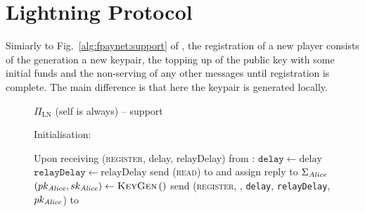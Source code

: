 \section{Lightning Protocol}
  \label{appendix:protocol}

  Simiarly to Fig.~\ref{alg:fpaynet:support} of \fpaynet, the registration of a
  new player consists of the generation a new keypair, the topping up of the
  public key with some initial funds and the non-serving of any other messages
  until registration is complete. The main difference is that here the keypair
  is generated locally.

  \begin{figure}[H]
    \begin{protocolbox}{$\Pi_{\mathrm{LN}}$ (self is \alice{} always) --
    support}
      \begin{algorithmic}[1]
        \State Initialisation:
        \Indent
        \EndIndent
        \Statex

        \State Upon receiving (\textsc{register}, delay, relayDelay) from
        \environment:
        \Indent
          \State $\mathtt{delay} \gets \mathrm{delay}$ 
          \label{alg:protocol:support:delay}
          \State $\mathtt{relayDelay} \gets \mathrm{relayDelay}$
          \State send (\textsc{read}) to \ledger{} and assign reply to
          $\Sigma_{\mathit{Alice}}$
          \label{alg:protocol:support:read}
          \State $\left(pk_{\mathit{Alice}}, sk_{\mathit{Alice}}\right) \gets
          \textsc{KeyGen}\left(\right)$
          \label{alg:protocol:support:keygen}
          \State send (\textsc{register}, \alice, \texttt{delay},
          \texttt{relayDelay}, $pk_{\mathit{Alice}}$) to \environment
        \EndIndent
        \Statex


\end{algorithmic}
\end{protocolbox}
\end{figure}
